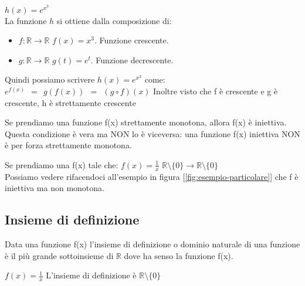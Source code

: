\begin{example}
    $h(x) = e^{x^3}$\\
    La funzione $h$ si ottiene dalla composizione di:
    \begin{itemize}
        \item $f: \mathbb{R} \longrightarrow \mathbb{R}$ \hspace{.3cm} $f(x) = x^3$. Funzione crescente.
        \item $g: \mathbb{R} \longrightarrow \mathbb{R}$ \hspace{.3cm} $g(t) = e^t$. Funzione decrescente.
    \end{itemize}
    Quindi possiamo scrivere $h(x) = e^{x^3}$ come: \hspace{.3cm} $e^{f(x)} \: \: = \: \: g(f(x)) \: \: = \: \: (g \circ f)(x)$
    Inoltre visto che f è crescente e g è crescente, h è strettamente crescente 
\end{example}
\begin{observation}
    Se prendiamo una funzione f(x) strettamente monotona, allora f(x) è iniettiva. Questa condizione è vera ma NON lo è viceversa: una funzione f(x) iniettiva NON è per forza strettamente monotona. 
\end{observation}
\begin{example}
    Se prendiamo una f(x) tale che: \hspace{.3cm} $f(x) = \frac{1}{x}$ \hspace{.3cm} $\mathbb{R} \setminus \{0\} \longrightarrow \mathbb{R} \setminus \{0\}$
    \\Possiamo vedere rifacendoci all'esempio in figura [\ref{fig:esempio-particolare}] che f è iniettiva ma non monotona.
\end{example}

\subsection{Insieme di definizione}
\begin{definition}
    Data una funzione f(x) l'insieme di definizione o dominio naturale di una funzione è il più grande sottoinsieme di $\mathbb{R}$ dove ha senso la funzione f(x).
\end{definition}
\begin{example}
    $f(x) = \frac{1}{x}$ \hspace{.3cm} L'insieme di definizione è $\mathbb{R} \setminus \{0\}$
\end{example}


